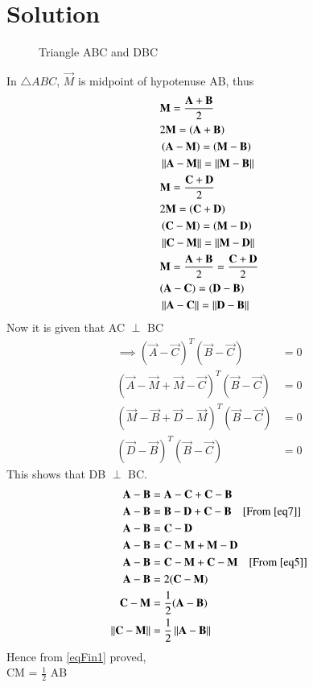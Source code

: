 \documentclass[journal,12pt,twocolumn]{IEEEtran}
\begin{document}
\section{Solution}
\renewcommand{\thefigure}{1}
\begin{figure}[hb]
\centering
\resizebox{.9\linewidth}{!}{}
\caption{Triangle ABC and DBC}
\label{myfig}
\end{figure}
In $\triangle{ABC}$, $\vec{M}$ is midpoint of hypotenuse AB, thus 
\begin{align}
&\mathbf{M} = \frac{\mathbf{A}+\mathbf{B}}{2}\label{eq1} \\
&2\mathbf{M} = \left(\mathbf{A+B}\right)\\
&\left(\mathbf{A-M}\right) = \left(\mathbf{M-B}\right)\\
&\left\lVert\mathbf{A}-\mathbf{M}\right\rVert=\left\lVert\mathbf{M}-\mathbf{B}\right\rVert\label{eq4} \\
&\mathbf{M} = \frac{\mathbf{C}+\mathbf{D}}{2}\label{eq2} \\
&2\mathbf{M} = \left(\mathbf{C+D}\right)\\
&\left(\mathbf{C-M}\right) = \left(\mathbf{M-D}\right)\\
&\left\lVert\mathbf{C}-\mathbf{M}\right\rVert=\left\lVert\mathbf{M}-\mathbf{D}\right\rVert\label{eq5} \\
&\mathbf{M} = \frac{\mathbf{A}+\mathbf{B}}{2} = \frac{\mathbf{C}+\mathbf{D}}{2}\label{eq3} \\
&(\mathbf{A - C}) = (\mathbf{D - B}) \\
&\left\lVert\mathbf{A - C}\right\rVert = \left\lVert\mathbf{D - B}\right\rVert\label{eq7}
\end{align} 
Now it is given that AC $\perp$ BC 
\begin{align}
\implies(\vec A -\vec C)^T(\vec{B}-\vec{C}) &= 0 \\
(\vec A -\vec M +\vec M -\vec C)^T(\vec{B}-\vec{C}) &= 0 \\
(\vec M -\vec B +\vec D -\vec M)^T(\vec{B}-\vec{C}) &= 0 \\
(\vec D -\vec B)^T(\vec{B}-\vec{C}) &= 0
\end{align}
This shows that DB $\perp$ BC.
\begin{align}
\mathbf{A - B} &= \mathbf{A - C}+\mathbf{C - B} \\
\mathbf{A - B} &= \mathbf{B - D}+\mathbf{C - B} \quad\text{[From \eqref{eq7}]}\\
\mathbf{A - B} &= \mathbf{C - D} \\
\mathbf{A - B} &= \mathbf{C - M}+\mathbf{M - D} \\
\mathbf{A - B} &= \mathbf{C - M}+\mathbf{C - M} \quad\text{[From \eqref{eq5}]} \\
\mathbf{A - B} &= 2 (\mathbf{C - M}) \\
\mathbf{C - M} &= \frac{1}{2}(\mathbf{A - B}) \\
\left\lVert\mathbf{C - M}\right\rVert &= \frac{1}{2}\left\lVert\mathbf{A - B}\right\rVert\label{eqFin1}
\end{align}
Hence from \eqref{eqFin1} proved,\\CM = $\frac{1}{2}$ AB
\end{document}
